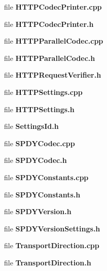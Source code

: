 \begin{DoxyCompactItemize}
file {\bf H\+T\+T\+P\+Codec\+Printer.\+cpp}
\item 
file {\bf H\+T\+T\+P\+Codec\+Printer.\+h}
\item 
file {\bf H\+T\+T\+P\+Parallel\+Codec.\+cpp}
\item 
file {\bf H\+T\+T\+P\+Parallel\+Codec.\+h}
\item 
file {\bf H\+T\+T\+P\+Request\+Verifier.\+h}
\item 
file {\bf H\+T\+T\+P\+Settings.\+cpp}
\item 
file {\bf H\+T\+T\+P\+Settings.\+h}
\item 
file {\bf Settings\+Id.\+h}
\item 
file {\bf S\+P\+D\+Y\+Codec.\+cpp}
\item 
file {\bf S\+P\+D\+Y\+Codec.\+h}
\item 
file {\bf S\+P\+D\+Y\+Constants.\+cpp}
\item 
file {\bf S\+P\+D\+Y\+Constants.\+h}
\item 
file {\bf S\+P\+D\+Y\+Version.\+h}
\item 
file {\bf S\+P\+D\+Y\+Version\+Settings.\+h}
\item 
file {\bf Transport\+Direction.\+cpp}
\item 
file {\bf Transport\+Direction.\+h}
\end{DoxyCompactItemize}
